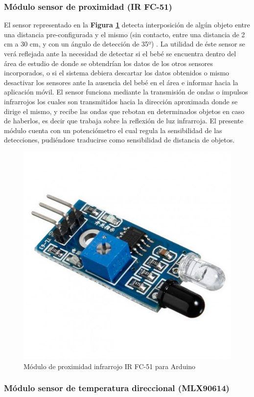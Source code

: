 \documentclass{IEEEtran}
\begin{document}
			\subsubsection{Módulo sensor de proximidad (\textbf{IR FC-51})}

				El sensor representado en la \textbf{Figura \ref{arduino-modulo-proximidad}} detecta interposición de algún objeto entre una distancia pre-configurada y el mismo (sin contacto, entre una distancia de 2 cm a 30 cm, y con un ángulo de detección de 35º) \cite{proximidadtecnico}. La utilidad de éste sensor se verá reflejada ante la necesidad de detectar si el bebé se encuentra dentro del área de estudio de donde se obtendrían los datos de los otros sensores incorporados, o si el sistema debiera descartar los datos obtenidos o mismo desactivar los sensores ante la ausencia del bebé en el área e informar hacia la aplicación móvil. El sensor funciona mediante la transmisión de ondas o impulsos infrarrojos los cuales son transmitidos hacia la dirección aproximada donde se dirige el mismo, y recibe las ondas que rebotan en determinados objetos en caso de haberlos, es decir que trabaja sobre la reflexión de luz infrarroja. El presente módulo cuenta con un potenciómetro el cual regula la sensibilidad de las detecciones, pudiéndose traducirse como sensibilidad de distancia de objetos. 

				\begin{figure}
					\centering
					\includegraphics[width=0.5\linewidth]{arduino-modulo-proximidad}
					\caption{Módulo de proximidad infrarrojo IR FC-51 para Arduino}
					\label{arduino-modulo-proximidad}
				\end{figure}

			\subsubsection{Módulo sensor de temperatura direccional (\textbf{MLX90614})}
			
\end{document}
